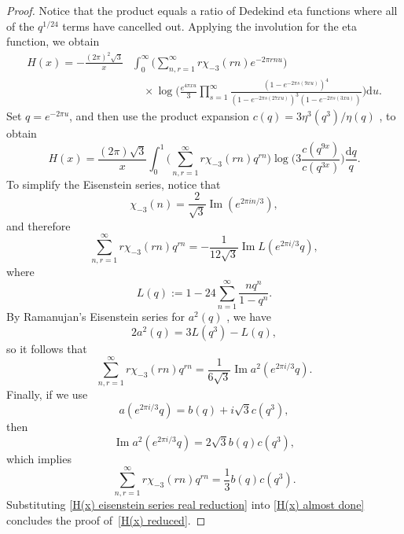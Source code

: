 \documentclass[12pt,reqno]{amsart}
\theoremstyle{remark}
\begin{document}
\begin{proof}
Notice that the product equals a ratio of Dedekind eta functions
where all of the $q^{1/24}$ terms have cancelled out. Applying the
involution for the eta function, we obtain
\begin{equation*}
\begin{split}
H(x)=-\frac{(2\pi)^2\sqrt{3}}{x}
&\int_{0}^{\infty}\biggl(\sum_{n,r=1}^{\infty}r\chi_{-3}(r n)e^{-2\pi r n u}\biggr)
\\ &\quad\times
\log\biggr(\frac{e^{4\pi xu}}{3}
\prod_{s=1}^{\infty}\frac{(1-e^{-2\pi s(9 x u)})^4}{(1-e^{-2\pi s(27x u)})^3(1-e^{-2\pi s(3 x u)})}\biggr) {{\mathrm d}} u.
\end{split}
\end{equation*}
Set $q=e^{-2\pi u}$, and then use the product expansion
$c(q)=3\eta^3(q^3)/\eta(q)$ \cite[pg.~109]{Be5}, to obtain
\begin{equation}\label{H(x) almost done}
H(x)=\frac{(2\pi)\sqrt{3}}{x}\int_{0}^{1}\biggl(\sum_{n,r=1}^{\infty}r\chi_{-3}(r n)q^{r n}\biggr)
\log\biggl(3\frac{c(q^{9x})}{c(q^{3x})}\biggr) \frac{{{\mathrm d}} q}{q}.
\end{equation}
To simplify the Eisenstein series, notice that
\begin{equation*}
\chi_{-3}(n)=\frac{2}{\sqrt{3}}{\operatorname{Im}}(e^{2\pi i n/3}),
\end{equation*}
and therefore
\begin{equation*}
\sum_{n,r=1}^{\infty}r\chi_{-3}(r n)q^{r n}
=-\frac{1}{12\sqrt{3}}{\operatorname{Im}} L(e^{2\pi i/3}q),
\end{equation*}
where
\begin{equation}
L(q):=1-24\sum_{n=1}^{\infty}\frac{n q^n}{1-q^n}.
\label{L(q)}
\end{equation}
By Ramanujan's Eisenstein series for $a^2(q)$ \cite[pg.~100]{Be5},
we have
\begin{equation*}
2a^2(q)=3L(q^3)-L(q),
\end{equation*}
so it follows that
\begin{equation*}
\sum_{n,r=1}^{\infty}r\chi_{-3}(r n)q^{r n}
=\frac{1}{6\sqrt{3}}{\operatorname{Im}} a^2(e^{2\pi i/3} q).
\end{equation*}
Finally, if we use
\begin{equation*}
a(e^{2\pi i/3} q)=b(q)+i\sqrt{3}c(q^3),
\end{equation*}
then
\begin{equation*}
{\operatorname{Im}} a^2(e^{2\pi i/3} q)=2\sqrt{3}b(q)c(q^3),
\end{equation*}
which implies
\begin{equation}\label{H(x) eisenstein series real reduction}
\sum_{n,r=1}^{\infty}r\chi_{-3}(r n)q^{r n}=\frac{1}{3}b(q)c(q^3).
\end{equation}
Substituting \eqref{H(x) eisenstein series real reduction} into
\eqref{H(x) almost done} concludes the proof of~\eqref{H(x) reduced}.
\end{proof}
\end{document}
